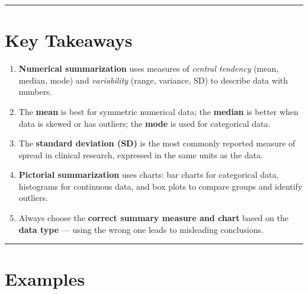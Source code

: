 \documentclass[
  12pt,
  letterpaper,
]{book}
\begin{document}
\begin{center}\rule{0.5\linewidth}{0.5pt}\end{center}


\chapter{Key Takeaways}\label{key-takeaways-1}

\begin{tcolorbox}[enhanced jigsaw, arc=.35mm, bottomrule=.15mm, bottomtitle=1mm, breakable, colback=white, colbacktitle=quarto-callout-note-color!10!white, colframe=quarto-callout-note-color-frame, coltitle=black, left=2mm, leftrule=.75mm, opacityback=0, opacitybacktitle=0.6, rightrule=.15mm, title={📝 Chapter 2 Summary}, titlerule=0mm, toprule=.15mm, toptitle=1mm]

\begin{enumerate}
\def\labelenumi{\arabic{enumi}.}
\item
  \textbf{Numerical summarization} uses measures of \emph{central
  tendency} (mean, median, mode) and \emph{variability} (range,
  variance, SD) to describe data with numbers.
\item
  The \textbf{mean} is best for symmetric numerical data; the
  \textbf{median} is better when data is skewed or has outliers; the
  \textbf{mode} is used for categorical data.
\item
  The \textbf{standard deviation (SD)} is the most commonly reported
  measure of spread in clinical research, expressed in the same units as
  the data.
\item
  \textbf{Pictorial summarization} uses charts: bar charts for
  categorical data, histograms for continuous data, and box plots to
  compare groups and identify outliers.
\item
  Always choose the \textbf{correct summary measure and chart} based on
  the \textbf{data type} --- using the wrong one leads to misleading
  conclusions.
\end{enumerate}

\end{tcolorbox}

\begin{center}\rule{0.5\linewidth}{0.5pt}\end{center}


\chapter{Examples}\label{examples-1}
\end{document}
